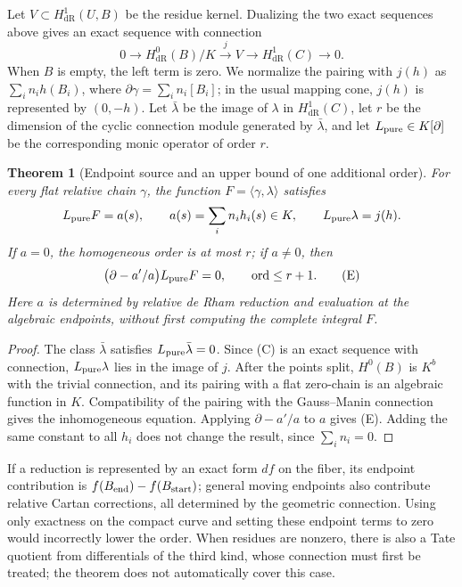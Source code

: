 \documentclass[11pt,a4paper,oneside]{article}
\theoremstyle{plain}
\newtheorem{theorem}{Theorem}[section]
\theoremstyle{definition}
\theoremstyle{remark}
\newcommand{\dR}{\mathrm{dR}}
\numberwithin{equation}{section}
\begin{document}
Let $V\subset H^1_{\dR}(U,B)$ be the residue kernel.
Dualizing the two exact sequences above gives an exact sequence with connection
\[
 0\longrightarrow H^0_{\dR}(B)/K
 \xrightarrow{j}V\longrightarrow H^1_{\dR}(C)\longrightarrow0.
 \tag{C}
\]
When $B$ is empty, the left term is zero.
We normalize the pairing with $j(h)$ as $\sum_i n_i h(B_i)$,
where $\partial\gamma=\sum_i n_i[B_i]$; in the usual mapping cone, $j(h)$ is represented by $(0,-h)$.
Let $\bar\lambda$ be the image of $\lambda$ in $H^1_{\dR}(C)$,
let $r$ be the dimension of the cyclic connection module generated by $\bar\lambda$,
and let $L_{\rm pure}\in K[\partial]$ be the corresponding monic operator of order $r$.

\begin{theorem}[Endpoint source and an upper bound of one additional order]\label{unified:thm:endpoint}
For every flat relative chain $\gamma$, the function $F=\langle\gamma,\lambda\rangle$ satisfies
\[
 L_{\rm pure}F=a(s),\qquad
 a(s)=\sum_i n_i h_i(s)\in K,\qquad
 L_{\rm pure}\lambda=j(h).
\]
If $a=0$, the homogeneous order is at most $r$; if $a\ne0$, then
\[
 \bigl(\partial-a'/a\bigr)L_{\rm pure}F=0,
 \qquad \operatorname{ord}\le r+1.
 \tag{E}
\]
Here $a$ is determined by relative de Rham reduction and evaluation at the algebraic endpoints,
without first computing the complete integral $F$.
\end{theorem}
\begin{proof}
The class $\bar\lambda$ satisfies $L_{\rm pure}\bar\lambda=0$.
Since (C) is an exact sequence with connection, $L_{\rm pure}\lambda$ lies in the image of $j$.
After the points split, $H^0(B)$ is $K^b$ with the trivial connection,
and its pairing with a flat zero-chain is an algebraic function in $K$.
Compatibility of the pairing with the Gauss--Manin connection gives the inhomogeneous equation.
Applying $\partial-a'/a$ to $a$ gives (E).
Adding the same constant to all $h_i$ does not change the result, since $\sum_i n_i=0$.
\end{proof}
If a reduction is represented by an exact form $df$ on the fiber, its endpoint contribution is
$f(B_{\rm end})-f(B_{\rm start})$;
general moving endpoints also contribute relative Cartan corrections, all determined by the geometric connection.
Using only exactness on the compact curve and setting these endpoint terms to zero would incorrectly lower the order.
When residues are nonzero, there is also a Tate quotient from differentials of the third kind,
whose connection must first be treated; the theorem does not automatically cover this case.
\end{document}
